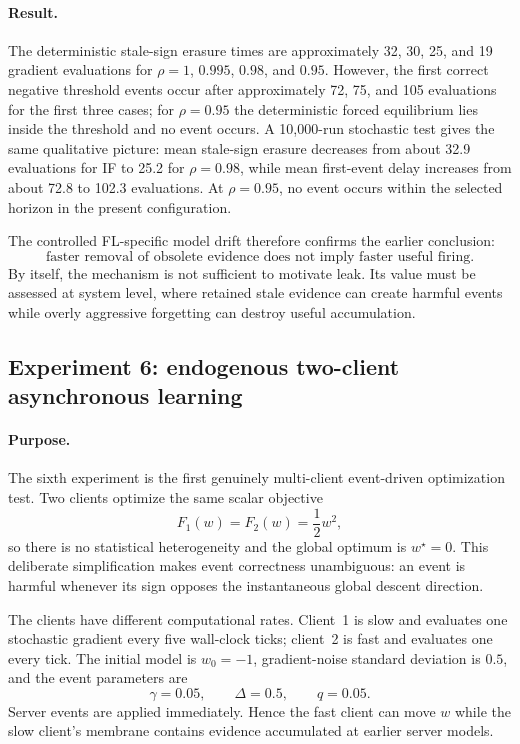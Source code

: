 \paragraph{Result.}
The deterministic stale-sign erasure times are approximately 32, 30, 25, and 19 gradient evaluations for $\rho=1$, $0.995$, $0.98$, and $0.95$. However, the first correct negative threshold events occur after approximately 72, 75, and 105 evaluations for the first three cases; for $\rho=0.95$ the deterministic forced equilibrium lies inside the threshold and no event occurs. A 10,000-run stochastic test gives the same qualitative picture: mean stale-sign erasure decreases from about 32.9 evaluations for IF to 25.2 for $\rho=0.98$, while mean first-event delay increases from about 72.8 to 102.3 evaluations. At $\rho=0.95$, no event occurs within the selected horizon in the present configuration.

The controlled FL-specific model drift therefore confirms the earlier conclusion:
\begin{equation}
  \boxed{\text{faster removal of obsolete evidence does not imply faster useful firing}.}
\end{equation}
By itself, the mechanism is not sufficient to motivate leak. Its value must be assessed at system level, where retained stale evidence can create harmful events while overly aggressive forgetting can destroy useful accumulation.

\subsection{Experiment 6: endogenous two-client asynchronous learning}

\paragraph{Purpose.}
The sixth experiment is the first genuinely multi-client event-driven optimization test. Two clients optimize the same scalar objective
\begin{equation}
  F_1(w)=F_2(w)=\frac12w^2,
\end{equation}
so there is no statistical heterogeneity and the global optimum is $w^\star=0$. This deliberate simplification makes event correctness unambiguous: an event is harmful whenever its sign opposes the instantaneous global descent direction.

The clients have different computational rates. Client~1 is slow and evaluates one stochastic gradient every five wall-clock ticks; client~2 is fast and evaluates one every tick. The initial model is $w_0=-1$, gradient-noise standard deviation is $0.5$, and the event parameters are
\begin{equation}
  \gamma=0.05,\qquad \Delta=0.5,\qquad q=0.05.
\end{equation}
Server events are applied immediately. Hence the fast client can move $w$ while the slow client's membrane contains evidence accumulated at earlier server models.

